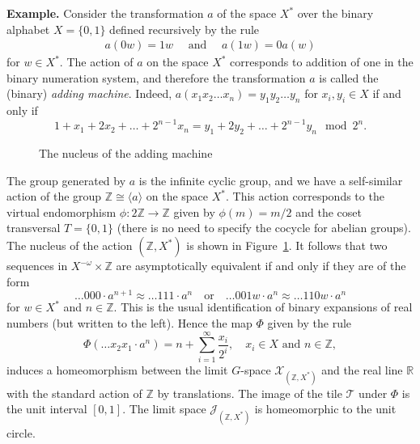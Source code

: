 \documentclass[12pt]{article}
\newcommand{\xmo}{X^{-\omega}}
\newcommand{\Z}{\mathbb{Z}}
\newcommand{\limGs}[1][G]{\mathcal{X}_{#1}}
\newcommand{\lims}[1][G]{\mathscr{J}_{#1}}
\newcommand{\tile}{\mathscr{T}}
\theoremstyle{definition}
\begin{document}
\textbf{Example.} Consider the transformation $a$ of the space $X^{*}$ over the binary alphabet
$X=\{0,1\}$ defined recursively by the rule
\begin{eqnarray*}
a(0w)=1w \quad \mbox{ and }\quad a(1w)=0a(w)
\end{eqnarray*}
for $w\in X^{*}$. The action of $a$ on the space $X^{*}$ corresponds to addition of one in the
binary numeration system, and therefore the transformation $a$ is called the (binary)
\textit{adding machine}. Indeed, $a(x_1x_2\ldots x_n)=y_1y_2\ldots y_n$ for $x_i,y_i\in X$ if and
only if
\[
1+x_1+2x_2+\ldots +2^{n-1}x_n=y_1+2y_2+\ldots+2^{n-1}y_n \mod 2^{n}.
\]
\begin{figure}
\begin{center}
    
  \caption{The nucleus
of the adding machine} \label{fig_AddingMachine}
\end{center}
\end{figure}
The group generated by $a$ is the infinite cyclic group, and we have a self-similar action of the
group $\Z\cong\langle a\rangle$ on the space $X^{*}$. This action corresponds to the virtual
endomorphism $\phi:2\Z\rightarrow\Z$ given by $\phi(m)=m/2$ and the coset transversal $T=\{0,1\}$
(there is no need to specify the cocycle for abelian groups). The nucleus of the action
$(\Z,X^{*})$ is shown in Figure~\ref{fig_AddingMachine}. It follows that two sequences in
$\xmo\times \Z$ are asymptotically equivalent if and only if they are of the form
\[
\ldots 000\cdot a^{n+1} \approx \ldots 111\cdot a^n \quad \mbox{or} \quad \ldots 001w\cdot a^n
\approx \ldots 110w\cdot a^n
\]
for $w\in X^{*}$ and $n\in\Z$. This is the usual identification of binary expansions of real
numbers (but written to the left). Hence the map $\Phi$ given by the rule
\[
\Phi(\ldots x_2x_1\cdot a^n)=n+\sum_{i=1}^{\infty} \frac{x_i}{2^i},\quad x_i\in X \mbox{ and }
n\in\Z,
\]
induces a homeomorphism between the limit $G$-space $\limGs[(\Z,X^{*})]$ and the real line
$\mathbb{R}$ with the standard action of $\Z$ by translations. The image of the tile $\tile$ under
$\Phi$ is the unit interval $[0,1]$. The limit space $\lims[(\Z,X^{*})]$ is homeomorphic to the
unit circle.

\end{document}

